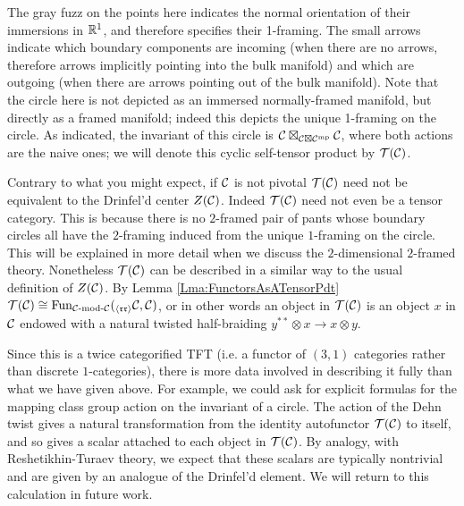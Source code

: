 \documentclass{amsart}
\begin{document}
\nid The gray fuzz on the points here indicates the normal orientation of their immersions in $\mathbb R^1$, and therefore specifies their 1-framing.  The small arrows indicate which boundary components are incoming (when there are no arrows, therefore arrows implicitly pointing into the bulk manifold) and which are outgoing (when there are arrows pointing out of the bulk manifold).    Note that the circle here is not depicted as an immersed normally-framed manifold, but directly as a framed manifold; indeed this depicts the unique 1-framing on the circle.  As indicated, the invariant of this circle is $\mathcal C \boxtimes_{\mathcal C \boxtimes \mathcal C^{\mathrm{mp}}} \mathcal C$, where both actions are the naive ones; we will denote this cyclic self-tensor product by $\mathcal T(\mathcal C)$.

\begin{warning}
Contrary to what you might expect,  if $\mathcal C$ is not pivotal $\mathcal T(\mathcal C)$ need not be equivalent to the Drinfel'd center $Z(\mathcal C)$.  Indeed $\mathcal T(\mathcal C)$ need not even be a tensor category.  This is because there is no $2$-framed pair of pants whose boundary circles all have the $2$-framing induced from the unique $1$-framing on the circle.  This will be explained in more detail when we discuss the $2$-dimensional $2$-framed theory.  Nonetheless $\mathcal T(\mathcal C)$ can be described in a similar way to the usual definition of $Z(\mathcal C)$.  By Lemma \ref{Lma:FunctorsAsATensorPdt} $\mathcal T(\mathcal C) \cong \operatorname{Fun}_{\mathcal C\text{-mod-}\mathcal C}({}_{\langle\mathfrak{r r}\rangle} {\mathcal C}_{}, \mathcal C)$, or in other words an object in $\mathcal T(\mathcal C)$ is an object $x$ in $\mathcal C$ endowed with a natural twisted half-braiding $y^{**} \otimes x \rightarrow x \otimes y$.
\end{warning}
\begin{remark}
Since this is a twice categorified TFT (i.e. a functor of $(3,1)$ categories rather than discrete $1$-categories), there is more data involved in describing it fully than what we have given above.  For example, we could ask for explicit formulas for the mapping class group action on the invariant of a circle.  The action of the Dehn twist gives a natural transformation from the identity autofunctor $\mathcal T(\mathcal C)$ to itself, and so gives a scalar attached to each object in $\mathcal T(\mathcal C)$.  By analogy, with Reshetikhin-Turaev theory, we expect that these scalars are typically nontrivial and are given by an analogue of the Drinfel'd element.   We will return to this calculation in future work.
\end{remark} 
\end{document}
